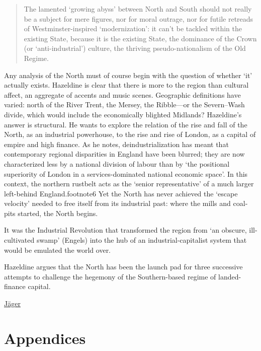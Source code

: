 \documentclass[
]{book}
\begin{document}
\begin{quote}
The lamented `growing abyss' between North and South should not really be a subject for mere figures, nor for moral outrage, nor for futile retreads of Westminster-inspired `modernization': it can't be tackled within the existing State, because it is the existing State, the dominance of the Crown (or `anti-industrial') culture, the thriving pseudo-nationalism of the Old Regime.
\end{quote}

Any analysis of the North must of course begin with the question of whether `it' actually exists. Hazeldine is clear that there is more to the region than cultural affect, an aggregate of accents and music scenes. Geographic definitions have varied: north of the River Trent, the Mersey, the Ribble---or the Severn--Wash divide, which would include the economically blighted Midlands? Hazeldine's answer is structural. He wants to explore the relation of the rise and fall of the North, as an industrial powerhouse, to the rise and rise of London, as a capital of empire and high finance. As he notes, deindustrialization has meant that contemporary regional disparities in England have been blurred; they are now characterized less by a national division of labour than by `the positional superiority of London in a services-dominated national economic space'. In this context, the northern rustbelt acts as the `senior representative' of a much larger left-behind England.footnote6 Yet the North has never achieved the `escape velocity' needed to free itself from its industrial past: where the mills and coal-pits started, the North begins.

It was the Industrial Revolution that transformed the region from `an obscure, ill-cultivated swamp' (Engels) into the hub of an industrial-capitalist system that would be emulated the world over.

Hazeldine argues that the North has been the launch pad for three successive attempts to challenge the hegemony of the Southern-based regime of landed-finance capital.

\href{https://newleftreview.org/issues/ii128/articles/anton-jager-rebel-regions}{Jäger}

\hypertarget{part-appendices}{%
\part{Appendices}\label{part-appendices}}

\hypertarget{appendix-appendices}{%
\appendix}
\end{document}
